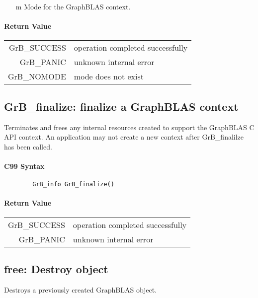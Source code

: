 \begin{itemize}
	\item[{\sf m}] Mode for the GraphBLAS context.
\end{itemize}

\paragraph{Return Value}

\begin{tabular}{rl}
{\sf GrB\_SUCCESS}	& operation completed successfully \\
{\sf GrB\_PANIC}	& unknown internal error \\
{\sf GrB\_NOMODE}	& mode does not exist \\
\end{tabular}


\subsection{{\sf GrB\_finalize}: finalize a GraphBLAS context}

Terminates and frees any internal resources created to 
support the GraphBLAS C API context.
An application may not create a new context after 
{\sf GrB\_finalilze} has been called.

\paragraph{C99 Syntax}

\begin{verbatim}
        GrB_info GrB_finalize()
\end{verbatim}

\paragraph{Return Value}

\begin{tabular}{rl}
{\sf GrB\_SUCCESS}	& operation completed successfully \\
{\sf GrB\_PANIC}	& unknown internal error \\
\end{tabular}

\subsection{{\sf free}: Destroy object}

Destroys a previously created GraphBLAS object.

